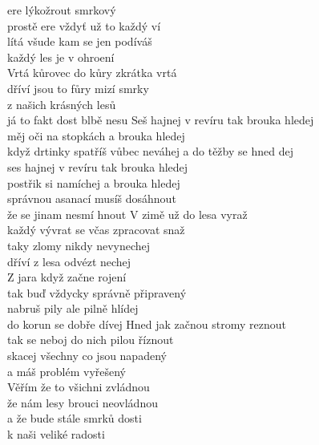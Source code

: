\ve{}
ere lýkožrout smrkový \\
prostě ere vždyť už to každý ví\\
lítá všude kam se jen podíváš\\
každý les je v ohroení\\
\ve{}
Vrtá kůrovec do kůry zkrátka vrtá\\
dříví jsou to fůry mizí smrky\\
z našich krásných lesů\\
já to fakt dost blbě nesu
\cho{}
Seš hajnej v revíru tak brouka hledej\\
měj oči na stopkách a brouka hledej\\
když drtinky spatříš vůbec neváhej
a do těžby se hned dej\\
ses hajnej v revíru tak brouka hledej\\
postřik si namíchej a  brouka hledej\\
správnou asanací musíš dosáhnout\\
že se jinam nesmí hnout
\ve{}
V zimě už do lesa vyraž\\
každý vývrat se včas zpracovat snaž\\
taky zlomy nikdy nevynechej\\
dříví z lesa odvézt nechej\\
Z jara když začne rojení\\
tak buď vždycky správně připravený\\
nabruš pily ale pilně hlídej\\
do korun se dobře dívej
\cho{}
\ve{}
Hned jak začnou stromy reznout\\
tak se neboj do nich pilou říznout\\
skacej všechny co jsou napadený\\
a máš problém vyřešený\\
Věřím že to všichni zvládnou\\
že nám lesy brouci neovládnou\\
a že bude stále smrků dosti\\
k naši veliké radosti
\cho{}
\esong{}